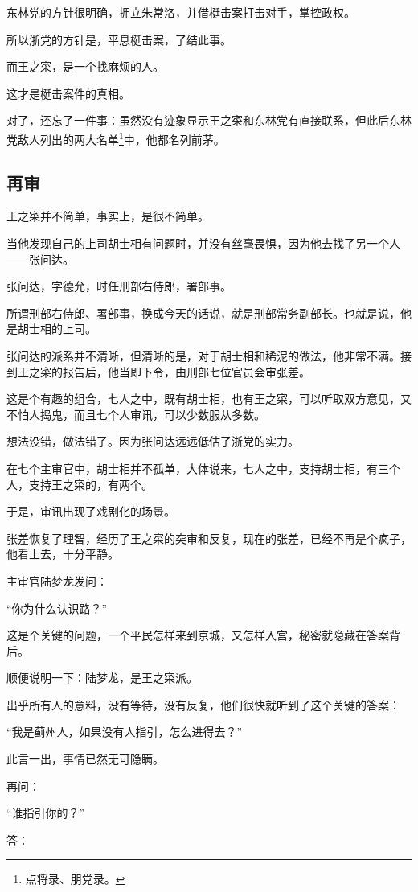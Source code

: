 \begin{multicols}{\theparacolNo}
		东林党的方针很明确，拥立朱常洛，并借梃击案打击对手，掌控政权。

		所以浙党的方针是，平息梃击案，了结此事。

		而王之寀，是一个找麻烦的人。

		这才是梃击案件的真相。

		对了，还忘了一件事：虽然没有迹象显示王之寀和东林党有直接联系，但此后东林党敌人列出的两大名单\footnote{点将录、朋党录。}中，他都名列前茅。

		\subsection{再审}
		王之寀并不简单，事实上，是很不简单。

		当他发现自己的上司胡士相有问题时，并没有丝毫畏惧，因为他去找了另一个人——张问达。

		张问达，字德允，时任刑部右侍郎，署部事。

		所谓刑部右侍郎、署部事，换成今天的话说，就是刑部常务副部长。也就是说，他是胡士相的上司。

		张问达的派系并不清晰，但清晰的是，对于胡士相和稀泥的做法，他非常不满。接到王之寀的报告后，他当即下令，由刑部七位官员会审张差。

		这是个有趣的组合，七人之中，既有胡士相，也有王之寀，可以听取双方意见，又不怕人捣鬼，而且七个人审讯，可以少数服从多数。

		想法没错，做法错了。因为张问达远远低估了浙党的实力。

		在七个主审官中，胡士相并不孤单，大体说来，七人之中，支持胡士相，有三个人，支持王之寀的，有两个。

		于是，审讯出现了戏剧化的场景。

		张差恢复了理智，经历了王之寀的突审和反复，现在的张差，已经不再是个疯子，他看上去，十分平静。

		主审官陆梦龙发问：

		“你为什么认识路？”

		这是个关键的问题，一个平民怎样来到京城，又怎样入宫，秘密就隐藏在答案背后。

		顺便说明一下：陆梦龙，是王之寀派。

		出乎所有人的意料，没有等待，没有反复，他们很快就听到了这个关键的答案：

		“我是蓟州人，如果没有人指引，怎么进得去？”

		此言一出，事情已然无可隐瞒。

		再问：

		“谁指引你的？”

		答：


\end{multicols}
